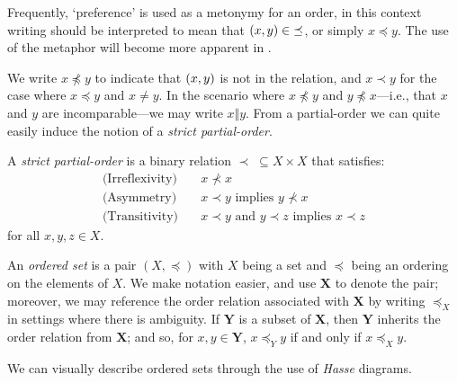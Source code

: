 Frequently, `preference' is used as a metonymy for an order, in this context writing  should be interpreted to mean that $(x,y) \in \; \preceq$, or simply $x \preceq y$. The use of the metaphor will become more apparent in .

We write $x \npreceq y$ to indicate that $(x,y)$ is not in the relation, and $x \prec y$ for the case where $x\preceq y$ and $x \not = y$. In the scenario where $x \not \preceq y$ and $y \not \preceq x$---i.e., that $x$ and $y$ are incomparable---we may write $x \Vert y$. From a partial-order we can quite easily induce the notion of a \emph{strict partial-order}.

\begin{definition}
  \label{definition:strict-partial-order}
  A \textit{strict partial-order}  is a binary relation $\prec \; \subseteq X \times X$ that satisfies:
  \begin{align}
     \text{(Irreflexivity)} \quad & x \nprec x \\
     \text{(Asymmetry)} \quad & x \prec y \text{ implies } y \nprec x \\
     \text{(Transitivity)} \quad & x \prec y \text{ and } y \prec z \text{ implies } x \prec z
  \end{align}
  for all $x,y,z \in X$.
\end{definition}

An \textit{ordered set} is a pair $(X, \preceq)$ with $X$ being a set and $\preceq$ being an ordering on the elements of $X$. We make notation easier, and use $\mathbf{X}$ to denote the pair; moreover, we may reference the order relation associated with $\mathbf{X}$ by writing $\preceq_X$ in settings where there is ambiguity. If $\mathbf{Y}$ is a subset of $\mathbf{X}$, then $\mathbf{Y}$ inherits the order relation from $\mathbf{X}$; and so, for $x,y \in \mathbf{Y}$, $x \preceq_Y y$ if and only if $x \preceq_X y$.

We can visually describe ordered sets through the use of \textit{Hasse} diagrams.

